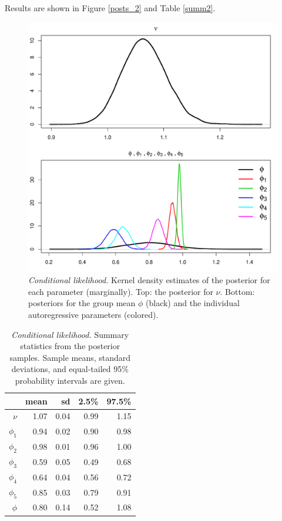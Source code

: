 \documentclass[12pt]{article}
\begin{document}
\noindent Results are shown in Figure \ref{posts_2} and Table \ref{summ2}.

\begin{figure}[H]
\begin{center}
\includegraphics[scale=0.60]{figs/posts_1.pdf}
\end{center}
\caption{\emph{Conditional likelihood.} Kernel density estimates of the posterior for each parameter (marginally). Top: the posterior for $\nu$. Bottom: posteriors for the group mean $\phi$ (black) and the individual autoregressive parameters (colored).}
\label{posts_1}
\end{figure}

\begin{table}[H]
\begin{center}
\begin{tabular}{rrrrr}
    \hline
 & mean & sd & 2.5\% & 97.5\% \\ 
    \hline
$\nu   $ & 1.07 & 0.04 & 0.99 & 1.15 \\ 
$\phi_1$ & 0.94 & 0.02 & 0.90 & 0.98 \\ 
$\phi_2$ & 0.98 & 0.01 & 0.96 & 1.00 \\ 
$\phi_3$ & 0.59 & 0.05 & 0.49 & 0.68 \\ 
$\phi_4$ & 0.64 & 0.04 & 0.56 & 0.72 \\ 
$\phi_5$ & 0.85 & 0.03 & 0.79 & 0.91 \\ 
$\phi  $ & 0.80 & 0.14 & 0.52 & 1.08 \\ 
    \hline
\end{tabular}
\end{center}
\caption{\emph{Conditional likelihood.} Summary statistics from the posterior samples. Sample means, standard deviations, and equal-tailed 95\% probability intervals are given.}
\label{summ1}
\end{table}
\end{document}
